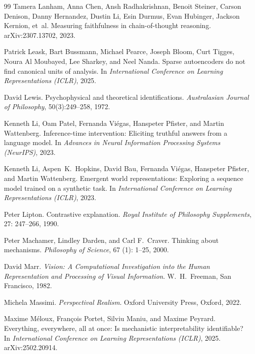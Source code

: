 \documentclass{article}
\begin{document}
\begin{thebibliography}{99}
Tamera Lanham, Anna Chen, Ansh Radhakrishnan, Benoit Steiner, Carson Denison,
  Danny Hernandez, Dustin Li, Esin Durmus, Evan Hubinger, Jackson Kernion,
  et~al.
\newblock Measuring faithfulness in chain-of-thought reasoning.
\newblock arXiv:2307.13702, 2023.

Patrick Leask, Bart Bussmann, Michael Pearce, Joseph Bloom, Curt Tigges, Noura Al Moubayed, Lee Sharkey, and Neel Nanda.
\newblock Sparse autoencoders do not find canonical units of analysis.
\newblock In \emph{International Conference on Learning Representations
  (ICLR)}, 2025.

David Lewis.
\newblock Psychophysical and theoretical identifications.
\newblock \emph{Australasian Journal of Philosophy}, 50(3):249--258, 1972.

Kenneth Li, Oam Patel, Fernanda Vi\'{e}gas, Hanspeter Pfister, and Martin Wattenberg.
\newblock Inference-time intervention: Eliciting truthful answers from a
  language model.
\newblock In \emph{Advances in Neural Information Processing Systems (NeurIPS)}, 2023.

Kenneth Li, Aspen~K.\ Hopkins, David Bau, Fernanda Vi\'{e}gas, Hanspeter
  Pfister, and Martin Wattenberg.
\newblock Emergent world representations: Exploring a sequence model trained on
  a synthetic task.
\newblock In \emph{International Conference on Learning Representations (ICLR)}, 2023.

Peter Lipton.
\newblock Contrastive explanation.
\newblock \emph{Royal Institute of Philosophy Supplements}, 27:
  247--266, 1990.

Peter Machamer, Lindley Darden, and Carl F.\ Craver.
\newblock Thinking about mechanisms.
\newblock \emph{Philosophy of Science}, 67 (1): 1--25, 2000.

David Marr.
\newblock \emph{Vision: A Computational Investigation into the Human
  Representation and Processing of Visual Information}.
\newblock W.\ H.\ Freeman, San Francisco, 1982.

Michela Massimi.
\newblock \emph{Perspectival Realism}.
\newblock Oxford University Press, Oxford, 2022.

Maxime M\'eloux, Fran\c{c}ois Portet, Silviu Maniu, and Maxime Peyrard.
\newblock Everything, everywhere, all at once: Is mechanistic interpretability
  identifiable?
\newblock In \emph{International Conference on Learning Representations
  (ICLR)}, 2025.
\newblock arXiv:2502.20914.


\end{thebibliography}
\end{document}
